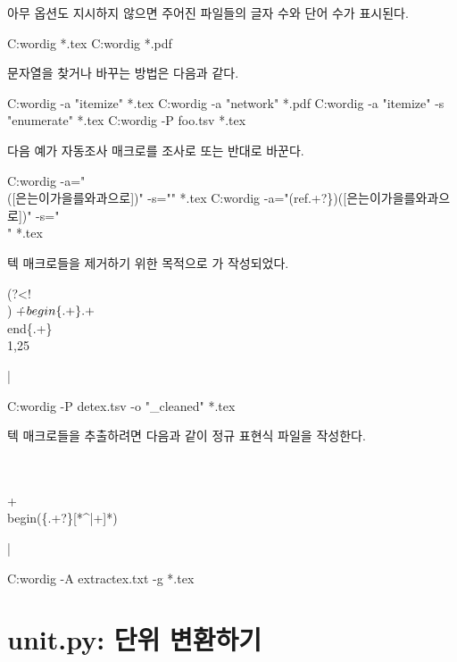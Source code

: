 아무 옵션도 지시하지 않으면 주어진 파일들의 글자 수와 단어 수가 표시된다.

\begin{code}
C:\>wordig *.tex
C:\>wordig *.pdf
\end{code}

문자열을 찾거나 바꾸는 방법은 다음과 같다.

\begin{code}
C:\>wordig -a "itemize" *.tex
C:\>wordig -a "network" *.pdf
C:\>wordig -a "itemize" -s "enumerate" *.tex
C:\>wordig -P foo.tsv *.tex
\end{code}

다음 예가 자동조사 매크로를 조사로 또는 반대로 바꾼다.

\begin{code}
C:\>wordig -a="\\([은는이가을를와과으로])" -s="\1" *.tex
C:\>wordig -a="(ref.+?\})([은는이가을를와과으로])" -s="\1\\\2" *.tex
\end{code}

텍 매크로들을 제거하기 위한 목적으로 가 작성되었다.

\begin{codewrite}
(?<!\\)%
\.+$
\\begin\{.+\}.+$
\\end\{.+\}
\\[a-zA-Z*]{1,25}
\end{codewrite}
\coderead|

\begin{code}
C:\>wordig -P detex.tsv -o "_cleaned" *.tex 
\end{code}

텍 매크로들을 추출하려면 다음과 같이 정규 표현식 파일을 작성한다.

\begin{codewrite}
\\[^a-zA-Z]
\\[a-zA-Z*^|+]+
\\begin(\{.+?\}[*^|+]*)
\end{codewrite}
\coderead|

\begin{code}
C:\>wordig -A extractex.txt -g *.tex 
\end{code}

\section{unit.py: 단위 변환하기}

